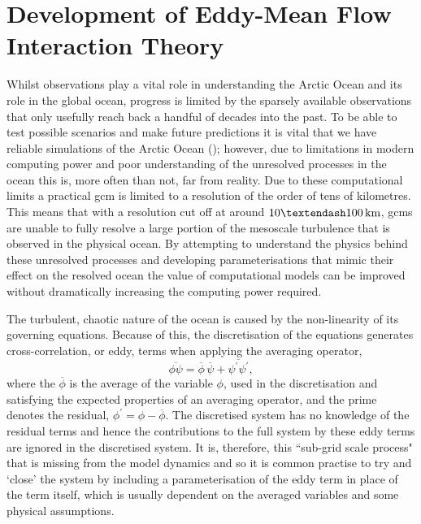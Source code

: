 \documentclass[12pt,a4paper]{report}
\newcommand*\mean[1]{\overline{#1}}
\newcommand*\res[1]{{#1}^{\prime}}
\begin{document}
\chapter{Development of Eddy-Mean Flow Interaction Theory}

\label{meaneddyinteractiontheory}

 Whilst observations play a vital role in understanding the Arctic
 Ocean and its role in the global ocean, progress is limited by the sparsely available
 observations that only usefully reach back a handful of decades into the past.
 To be able to test possible scenarios and make future predictions it is vital
 that we have reliable simulations of the Arctic Ocean (\cite{proshutinsky2008toward});
 however, due to limitations
 in modern computing power and poor understanding of the unresolved processes 
 in the ocean this is, more often than not, far from reality.
 Due to these computational limits a practical \gls{gcm} is 
 limited to a  resolution of the order of tens of kilometres. This means that with a 
 resolution  cut off at around $10 \textendash 100 \, \mathrm{km}$, 
 \glspl{gcm} are unable to fully resolve a large portion of the mesoscale turbulence that is
 observed in the physical ocean.
 By attempting  to understand the physics behind these unresolved processes 
 and developing parameterisations that mimic their effect on the resolved ocean
 the value of computational models can be improved without dramatically increasing the
 computing power required.  
 
 The turbulent, chaotic nature of the ocean is caused by the non-linearity of its 
 governing equations. Because of this,  the discretisation of the equations generates cross-correlation, or eddy, terms when applying the 
 averaging operator,
 \begin{equation}
 \mean{\phi\psi} = \mean{\phi}\,\mean{\psi} + 
 \mean{\res{\psi}\res{\psi}},
 \label{non-lin average}
 \end{equation}
 where the ${\mean{\phi}}$ is the average of the variable ${\phi}$, used in
 the discretisation and satisfying
 the expected properties of an averaging operator, and the prime denotes the residual, ${\phi^{\prime} = \phi - \mean{\phi}}$.
 The discretised system has no knowledge of the residual terms and hence
 the contributions to the full system by these eddy terms are
 ignored in the discretised system. It is, therefore, this ``sub-grid scale process"
 that is missing from the model dynamics and so it is common practise to try and
 `close' the system by including a parameterisation of the eddy
 term in place of the term itself, which is usually dependent on the averaged 
 variables and some physical assumptions.
 
\end{document}
